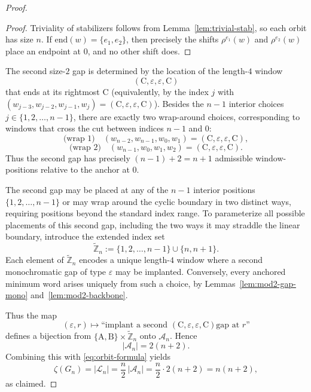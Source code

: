 \documentclass[10pt,a4paper]{amsart}
\newcommand{\ZZ}{\mathbb{Z}}
\newcommand{\colA}{\mathrm{A}}
\newcommand{\colB}{\mathrm{B}}
\newcommand{\colC}{\mathrm{C}}
\begin{document}
\begin{proof}
\begin{proof}
Triviality of stabilizers follows from Lemma~\ref{lem:trivial-stab}, so each orbit has
size $n$.  If $\mathrm{end}(w)=\{e_1,e_2\}$, then precisely the shifts
$\rho^{e_1}(w)$ and $\rho^{e_2}(w)$ place an endpoint at $0$, and no other shift does.
\end{proof}

The second size-$2$ gap is determined by the location of the length-$4$ window
\[
(\colC,\varepsilon,\varepsilon,\colC)
\]
that ends at its rightmost $\colC$ (equivalently, by the index $j$ with
$(w_{j-3},w_{j-2},w_{j-1},w_j)=(\colC,\varepsilon,\varepsilon,\colC)$).
Besides the $n-1$ interior choices $j\in\{1,2,\dots,n-1\}$, there are exactly two
wrap-around choices, corresponding to windows that cross the cut between indices
$n-1$ and $0$:
\[
\text{(wrap 1)}\quad (w_{n-2},w_{n-1},w_0,w_1)=(\colC,\varepsilon,\varepsilon,\colC),
\]
\[
\text{(wrap 2)}\quad (w_{n-1},w_0,w_1,w_2)=(\colC,\varepsilon,\varepsilon,\colC).
\]
Thus the second gap has precisely $(n-1)+2=n+1$ admissible window-positions relative to
the anchor at $0$.

The second gap may be placed at any of the $n-1$ interior positions $\{1,2,\dots,n-1\}$
or may wrap around the cyclic boundary in two distinct ways, requiring positions beyond
the standard index range.
To parameterize all possible placements of this second gap, including the two ways it
may straddle the linear boundary, introduce the extended index set
\[
\widetilde{\ZZ}_n:=\{1,2,\dots,n-1\}\cup\{n,n+1\}.
\]
Each element of $\widetilde{\ZZ}_n$ encodes a unique length-$4$ window where a second
monochromatic gap of type $\varepsilon$ may be implanted.  Conversely, every anchored
minimum word arises uniquely from such a choice, by Lemmas~\ref{lem:mod2-gap-mono}
and~\ref{lem:mod2-backbone}.

Thus the map
\[
(\varepsilon,r)\longmapsto\text{``implant a second $(\colC,\varepsilon,\varepsilon,\colC)$
gap at $r$''}
\]
defines a bijection from $\{\colA,\colB\}\times\widetilde{\ZZ}_n$ onto $\mathcal{A}_n$.
Hence
\[
|\mathcal{A}_n|=2(n+2).
\]
Combining this with \eqref{eq:orbit-formula} yields
\[
\zeta(G_n)=|\mathcal{L}_n|
=\frac{n}{2}\,|\mathcal{A}_n|
=\frac{n}{2}\cdot 2(n+2)
=n(n+2),
\]
as claimed.
\end{proof}
\end{document}
